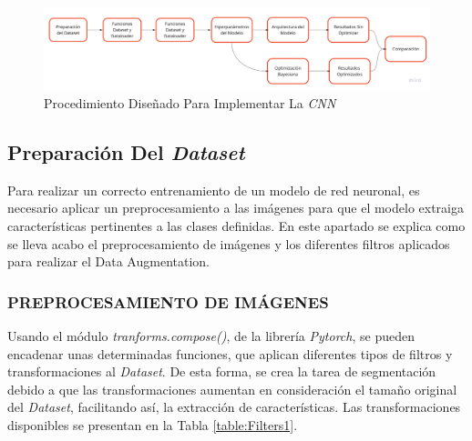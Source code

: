 	\begin{figure}[ht]
		\centering
		\includegraphics[scale=0.15]{Figs/procedimiento.jpg}
		\caption{Procedimiento Diseñado Para Implementar La \textit{CNN}}
		\label{fig:procedimiento}
	\end{figure}	


		\newpage
		\subsection{Preparación Del \textit{Dataset}}
		
		Para realizar un correcto entrenamiento de un modelo de red neuronal, es necesario aplicar un preprocesamiento a las imágenes para que el modelo extraiga características pertinentes a las clases definidas. En este apartado se explica como se lleva acabo el preprocesamiento de imágenes y los diferentes filtros aplicados para realizar el Data Augmentation.
		
			\subsubsection{PREPROCESAMIENTO DE IMÁGENES}

			Usando el módulo \textit{tranforms.compose()}, de la librería \textit{Pytorch}, se pueden encadenar unas determinadas funciones, que aplican diferentes tipos de filtros y transformaciones al \textit{Dataset}. De esta forma, se crea la tarea de segmentación debido a que las transformaciones aumentan en consideración el tamaño original del \textit{Dataset}, facilitando así, la extracción de características. Las transformaciones disponibles se presentan en la Tabla \ref{table:Filters1}.
			
